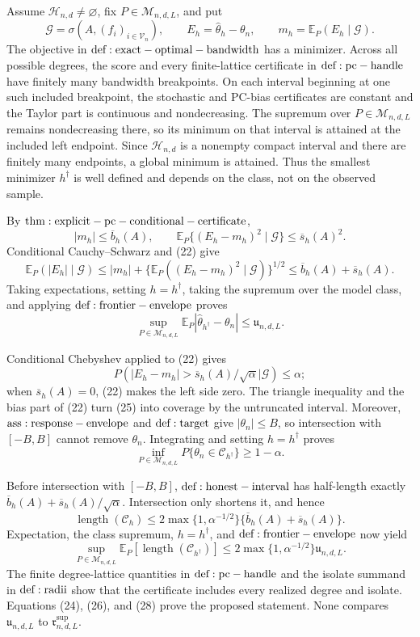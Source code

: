Assume \(\mathcal H_{n,d}\ne\varnothing\), fix \(P\in\mathcal M_{n,d,L}\), and put
\[
 \mathcal G=\sigma\!\left(A,(f_i)_{i\in\mathcal V_n}\right),
 \qquad E_h=\widehat\theta_h-\theta_n,
 \qquad m_h=\mathbb E_P(E_h\mid\mathcal G).
\tag{21}
\]
The objective in \({\rm def:exact-optimal-bandwidth}\) has a minimizer.  Across all possible degrees, the score and every finite-lattice certificate in \({\rm def:pc-handle}\) have finitely many bandwidth breakpoints.  On each interval beginning at one such included breakpoint, the stochastic and PC-bias certificates are constant and the Taylor part is continuous and nondecreasing.  The supremum over \(P\in\mathcal M_{n,d,L}\) remains nondecreasing there, so its minimum on that interval is attained at the included left endpoint.  Since \(\mathcal H_{n,d}\) is a nonempty compact interval and there are finitely many endpoints, a global minimum is attained.  Thus the smallest minimizer \(h^\dagger\) is well defined and depends on the class, not on the observed sample.

By \({\rm thm:explicit-pc-conditional-certificate}\),
\[
 |m_h|\le\overline b_h(A),
 \qquad
 \mathbb E_P\{(E_h-m_h)^2\mid\mathcal G\}
 \le\overline s_h(A)^2.
\tag{22}
\]
Conditional Cauchy--Schwarz and (22) give
\[
 \mathbb E_P(|E_h|\mid\mathcal G)
 \le |m_h|+\{\mathbb E_P((E_h-m_h)^2\mid\mathcal G)\}^{1/2}
 \le\overline b_h(A)+\overline s_h(A).
\tag{23}
\]
Taking expectations, setting \(h=h^\dagger\), taking the supremum over the model class, and applying \({\rm def:frontier-envelope}\) proves
\[
 \sup_{P\in\mathcal M_{n,d,L}}
 \mathbb E_P|\widehat\theta_{h^\dagger}-\theta_n|
 \le\mathfrak u_{n,d,L}.
\tag{24}
\]

Conditional Chebyshev applied to (22) gives
\[
 P\!\left(
 |E_h-m_h|>\overline s_h(A)/\sqrt\alpha
 \mathrel{\Big|}\mathcal G\right)\le\alpha;
\tag{25}
\]
when \(\overline s_h(A)=0\), (22) makes the left side zero.  The triangle inequality and the bias part of (22) turn (25) into coverage by the untruncated interval.  Moreover, \({\rm ass:response-envelope}\) and \({\rm def:target}\) give \(|\theta_n|\le B\), so intersection with \([-B,B]\) cannot remove \(\theta_n\).  Integrating and setting \(h=h^\dagger\) proves
\[
 \inf_{P\in\mathcal M_{n,d,L}}P\{\theta_n\in\mathcal C_{h^\dagger}\}
 \ge1-\alpha.
\tag{26}
\]

Before intersection with \([-B,B]\), \({\rm def:honest-interval}\) has half-length exactly \(\overline b_h(A)+\overline s_h(A)/\sqrt\alpha\).  Intersection only shortens it, and hence
\[
 \operatorname{length}(\mathcal C_h)
 \le2\max\{1,\alpha^{-1/2}\}
 \{\overline b_h(A)+\overline s_h(A)\}.
\tag{27}
\]
Expectation, the class supremum, \(h=h^\dagger\), and \({\rm def:frontier-envelope}\) now yield
\[
 \sup_{P\in\mathcal M_{n,d,L}}
 \mathbb E_P[\operatorname{length}(\mathcal C_{h^\dagger})]
 \le2\max\{1,\alpha^{-1/2}\}\mathfrak u_{n,d,L}.
\tag{28}
\]
The finite degree-lattice quantities in \({\rm def:pc-handle}\) and the isolate summand in \({\rm def:radii}\) show that the certificate includes every realized degree and isolate.  Equations (24), (26), and (28) prove the proposed statement.  None compares \(\mathfrak u_{n,d,L}\) to \(\mathfrak r^{\mathrm{sup}}_{n,d,L}\).